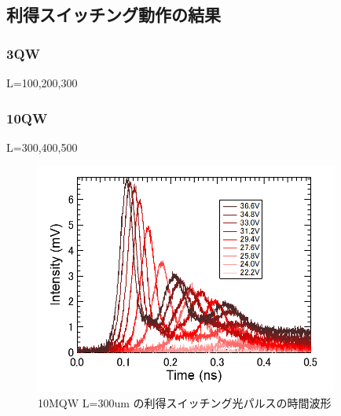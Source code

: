 \subsection{利得スイッチング動作の結果}
\subsubsection{3QW}%
L=100,200,300

\subsubsection{10QW}%
L=300,400,500
\begin{figure}[h]
	\centering
	\includegraphics[width=10cm]{figure/fig_3_2_10QW_ridge_L300_GS.png}
		\caption{10MQW L=300um の利得スイッチング光パルスの時間波形}
		\label{fig:fig_3_2_10QW_ridge_L400_GS}
\end{figure}

